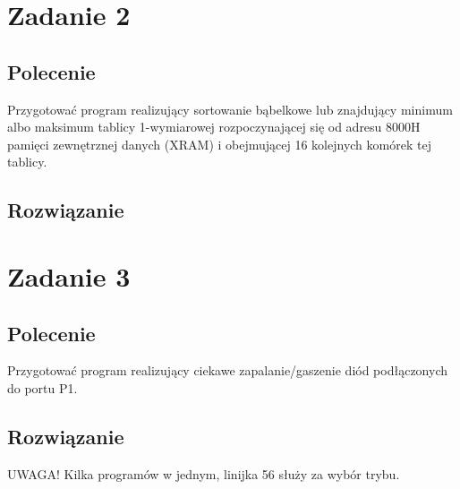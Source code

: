 \documentclass[a4paper,12pt]{extarticle}  %
\begin{document}
\section{Zadanie 2}
\subsection{Polecenie}
Przygotować program realizujący sortowanie bąbelkowe lub znajdujący minimum albo maksimum
tablicy 1-wymiarowej rozpoczynającej się od adresu 8000H pamięci zewnętrznej danych (XRAM)
i obejmującej 16 kolejnych komórek tej tablicy.
\subsection{Rozwiązanie}

\section{Zadanie 3}
\subsection{Polecenie}
Przygotować program realizujący ciekawe zapalanie/gaszenie diód podłączonych do portu P1.
\subsection{Rozwiązanie}
UWAGA! Kilka programów w jednym, linijka 56 służy za wybór trybu.

\end{document}
